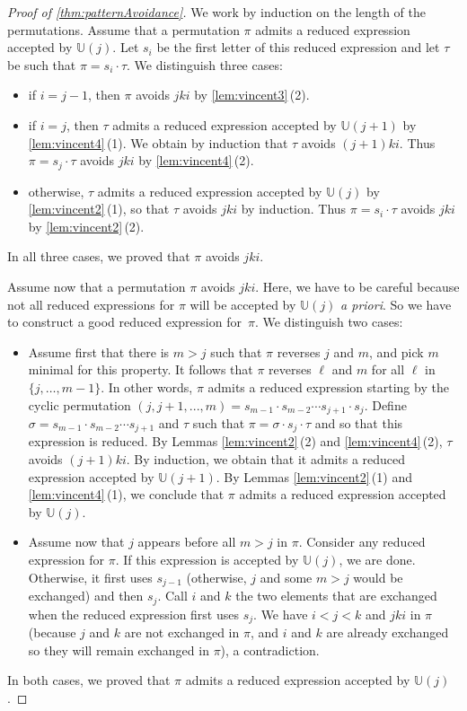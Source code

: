 \documentclass{amsart}
\newcommand{\apriori}{\textit{a priori}} %
\newcommand{\automatonU}{\mathbb{U}} %
\begin{document}
\begin{proof}[Proof of \cref{thm:patternAvoidance}]
We work by induction on the length of the permutations.
Assume that a permutation $\pi$ admits a reduced expression accepted by $\automatonU(j)$. Let $s_i$ be the first letter of this reduced expression and let $\tau$ be such that $\pi = s_i \cdot \tau$. We distinguish three cases:\begin{itemize}
	\item if $i = j-1$, then $\pi$ avoids $jki$ by \cref{lem:vincent3}\,(2).
	\item if $i = j$, then $\tau$ admits a reduced expression accepted by $\automatonU(j+1)$ by \cref{lem:vincent4}\,(1). We obtain by induction that $\tau$ avoids $(j+1)ki$. Thus $\pi = s_j \cdot \tau$ avoids $jki$ by \cref{lem:vincent4}\,(2).
	\item otherwise, $\tau$ admits a reduced expression accepted by $\automatonU(j)$ by \cref{lem:vincent2}\,(1), so that $\tau$ avoids $jki$ by induction. Thus $\pi = s_i \cdot \tau$ avoids $jki$ by \cref{lem:vincent2}\,(2).
\end{itemize}
In all three cases, we proved that $\pi$ avoids $jki$.

Assume now that a permutation $\pi$ avoids $jki$. Here, we have to be careful because not all reduced expressions for $\pi$ will be accepted by $\automatonU(j)$ \apriori. So we have to construct a good reduced expression for~$\pi$. We distinguish two cases:
\begin{itemize}
	\item Assume first that there is $m > j$ such that $\pi$ reverses $j$ and $m$, and pick $m$ minimal for this property. It follows that $\pi$ reverses $\ell$ and $m$ for all $\ell$ in $\{j,\dots,m-1\}$. In other words, $\pi$ admits a reduced expression starting by the cyclic permutation $(j, j+1, ..., m) = s_{m-1} \cdot s_{m-2} \cdots s_{j+1} \cdot s_j$. Define $\sigma = s_{m-1} \cdot s_{m-2}\cdots s_{j+1}$ and $\tau$ such that $\pi = \sigma \cdot s_j \cdot \tau$ and so that this expression is reduced. By Lemmas \ref{lem:vincent2}\,(2) and \ref{lem:vincent4}\,(2), $\tau$ avoids $(j+1)ki$. By induction, we obtain that it admits a reduced expression accepted by $\automatonU(j+1)$. By Lemmas \ref{lem:vincent2}\,(1) and \ref{lem:vincent4}\,(1), we conclude that $\pi$ admits a reduced expression accepted by $\automatonU(j)$.
	\item Assume now that $j$ appears before all $m > j$ in $\pi$. Consider any reduced expression for $\pi$. If this expression is accepted by $\automatonU(j)$, we are done. Otherwise, it first uses $s_{j-1}$ (otherwise, $j$ and some $m > j$ would be exchanged) and then $s_j$. Call $i$ and $k$ the two elements that are exchanged when the reduced expression first uses $s_j$. We have $i < j < k$ and $jki$ in $\pi$ (because $j$ and $k$ are not exchanged in $\pi$, and $i$ and $k$ are already exchanged so they will remain exchanged in $\pi$), a contradiction.
\end{itemize}
In both cases, we proved that $\pi$ admits a reduced expression accepted by $\automatonU(j)$.
\end{proof}
\end{document}
